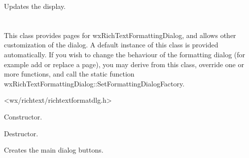 
Updates the display.


%
%


\section{}\label{wxrichtextformattingdialogfactory}

This class provides pages for wxRichTextFormattingDialog, and allows other customization of the dialog.
A default instance of this class is provided automatically. If you wish to change the behaviour of the
formatting dialog (for example add or replace a page), you may derive from this class,
override one or more functions, and call the static function wxRichTextFormattingDialog::SetFormattingDialogFactory.
 



<wx/richtext/richtextformatdlg.h>



\label{wxrichtextformattingdialogfactorywxrichtextformattingdialogfactory}


Constructor.

\label{wxrichtextformattingdialogfactorydtor}


Destructor.

\label{wxrichtextformattingdialogfactorycreatebuttons}


Creates the main dialog buttons.

\label{wxrichtextformattingdialogfactorycreatepage}


